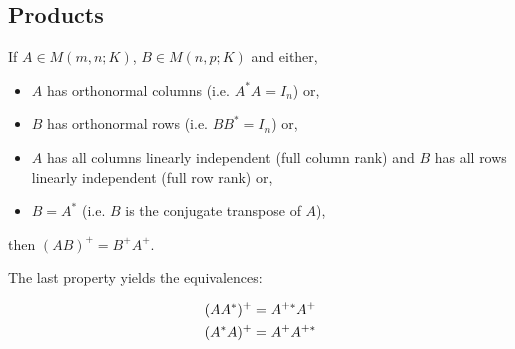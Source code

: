 \subsection{Products}

If $A \in M(m,n;K)$, $B \in M(n,p;K)$ and either, 
\begin{itemize}
    \item $A$ has orthonormal columns (i.e. $A^*A = I_n$) or, 
    \item $B$ has orthonormal rows (i.e. $BB^* = I_n$) or,
    \item $A$ has all columns linearly independent (full column rank) and $B$ has all rows linearly independent (full row rank) or,
    \item $B = A^*$ (i.e. $B$ is the conjugate transpose of $A$),
\end{itemize}
then $(AB)^+ = B^+A^+$.

The last property yields the equivalences:

\begin{eqnarray}
    \begin{gathered}
        (AA^*)^+ = A^{+*}A^+  \notag\\
        (A^*A)^+ = A^+ A^{+*}
    \end{gathered}
    \label{eq0.2.6}
\end{eqnarray}
